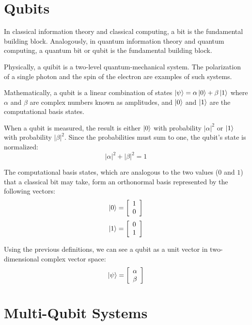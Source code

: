 
\section{Qubits}

In classical information theory and classical computing, a bit is the fundamental building block.
Analogously, in quantum information theory and quantum computing, a quantum bit or qubit is the fundamental building block.

Physically, a quibit is a two-level quantum-mechanical system. The polarization of a single photon and the spin of the electron are examples of such systems.

Mathematically, a qubit is a linear combination of states $\left|{\psi}\right\rangle=\alpha\left|{0}\right\rangle+\beta\left|{1}\right\rangle$ where $\alpha$ and $\beta$ are complex numbers known as amplitudes, and $\left|{0}\right\rangle$ and $\left|{1}\right\rangle$ are the computational basis states.

When a qubit is measured, the result is either $\left|{0}\right\rangle$ with probability $|\alpha|^2$ or $\left|{1}\right\rangle$ with probability $|\beta|^2$.
Since the probabilities must sum to one, the qubit's state is normalized:
$$|\alpha|^2+|\beta|^2=1$$

The computational basis states, which are analogous to the two values ($0$ and $1$) that a classical bit may take, form an orthonormal basis represented by the following vectors:
$$\left|{0}\right\rangle=\left[\begin{array}{c}1 \\ 0\end{array}\right]$$
$$\left|{1}\right\rangle=\left[\begin{array}{c}0 \\ 1\end{array}\right]$$

Using the previous definitions, we can see a qubit as a unit vector in two-dimensional complex vector space:
\[\left|{\psi}\right\rangle=\left[\begin{array}{c}\alpha \\ \beta\end{array}\right]\]

\section{Multi-Qubit Systems}


